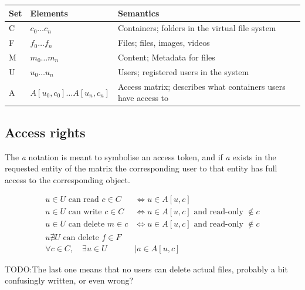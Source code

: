 \documentclass[a4paper,12pt]{article}
\newcommand{\Iff}{\Leftrightarrow}
\newcommand{\fix}{\colorbox{yellow!30}{TODO:}}
\begin{document}
\begin{center}
    \begin{tabular}{ | l | l | l | p{5cm} |}
        \hline
        \textbf{Set} & \textbf{Elements} & \textbf{Semantics} \\ \hline
        C   & $c_0\dots c_n$                & Containers; folders in the virtual file system\\ \hline
        F   & $f_0\dots f_n$                & Files; files, images, videos\\ \hline
        M   & $m_0\dots m_n$                & Content; Metadata for files\\ \hline
        U   & $u_0\dots u_n$                & Users; registered users in the system\\ \hline
        A   & $A[u_0,c_0]\dots A[u_n, c_n]$ & Access matrix; describes what containers users have access to\\ \hline
    \end{tabular}
\end{center}


\subsection{Access rights}
The \textit{a} notation is meant to symbolise an access token, and if \textit{a} exists in the
requested entity of the matrix the corresponding user to that entity has full access to the
corresponding object.

\begin{equation}
    \begin{split}
        u \in U \text{ can read } c \in C & \Iff u \in A[u,c] \\
        u \in U \text{ can write } c \in C & \Iff u \in A[u,c] \text{ and read-only } \notin c \\
        u \in U \text{ can delete } m \in c & \Iff u \in A[u,c] \text{ and read-only } \notin c \\
        u \nexists U \text{ can delete } f \in F \\
        \forall c \in C, \quad \exists u \in U & \mid a \in A[u,c] 
    \end{split}
\end{equation}

\fix The last one means that no users can delete actual files, probably a bit confusingly written, 
or even wrong?
\end{document}
